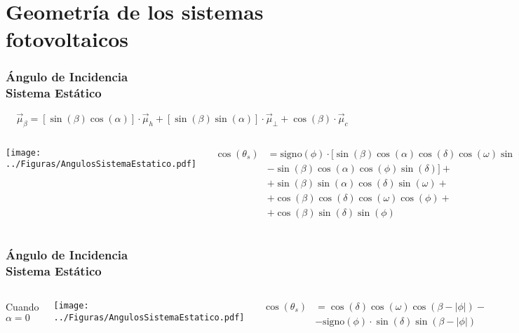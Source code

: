 \documentclass[xcolor=dvipsnames]{beamer}
\begin{document}
\section{Geometría de los sistemas fotovoltaicos}


\begin{frame}[plain]
  \frametitle{Ángulo de Incidencia\\
    Sistema Estático}
\[
\vec{\mu}_{\beta}=[\sin(\beta)\cos(\alpha)]\cdot\vec{\mu}_{h}+[\sin(\beta)\sin(\alpha)]\cdot\vec{\mu}_{\bot}+\cos(\beta)\cdot\vec{\mu}_{c}\]

  \begin{columns}%

    \column{4cm}

\texttt{[image: ../Figuras/AngulosSistemaEstatico.pdf]}


\column{4cm}

{\small 
\begin{align*}
\cos(\theta_{s}) & =\mathrm{signo}(\phi)\cdot\bigl[\sin(\beta)\cos(\alpha)\cos\left(\delta\right)\cos\left(\omega\right)\sin\left(\phi\right)-\nonumber \\
 & -\sin(\beta)\cos(\alpha)\cos\left(\phi\right)\sin\left(\delta\right)\bigr]+\nonumber \\
 & +\sin(\beta)\sin(\alpha)\cos\left(\delta\right)\sin\left(\omega\right)+\nonumber \\
 & +\cos(\beta)\cos\left(\delta\right)\cos\left(\omega\right)\cos\left(\phi\right)+\nonumber \\
 & +\cos(\beta)\sin\left(\delta\right)\sin\left(\phi\right)\label{eq:cosThetaEstatica}\end{align*}
}{\small \par}

\end{columns}%

\end{frame}

\begin{frame}[plain]
  \frametitle{Ángulo de Incidencia\\
    Sistema Estático}
  \begin{columns}%


    \column{4cm}

    Cuando $\alpha=0$

    \texttt{[image: ../Figuras/AngulosSistemaEstatico.pdf]}


    \column{6cm}
    \begin{align*}
\cos(\theta_{s})& = \cos\left(\delta\right)\cos\left(\omega\right)\cos\left(\beta-|\phi|\right)-\\ 
& - \mathrm{signo}(\phi)\cdot\sin(\delta)\sin\left(\beta-|\phi|\right)
          \end{align*}
  

\end{columns}%

\end{frame}
\end{document}
